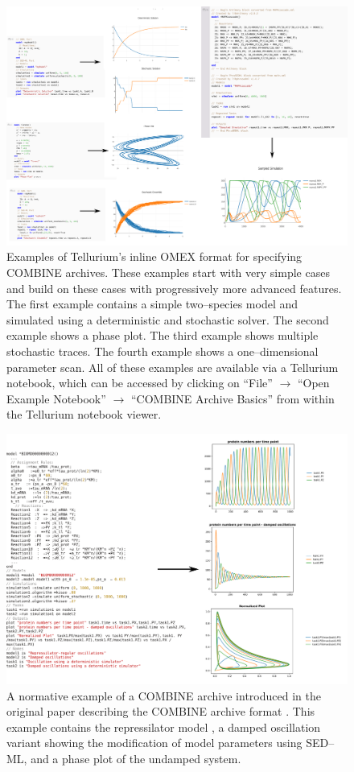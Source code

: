 \documentclass[10pt,letterpaper]{article}
\begin{document}
\begin{figure}
  \includegraphics[width=1.0\textwidth]{fig-inline-omex.pdf}
  \caption{Examples of Tellurium's inline OMEX format for specifying COMBINE archives. These examples start with very simple cases and build on these cases with progressively more advanced features. The first example contains a simple two--species model and simulated using a deterministic and stochastic solver. The second example shows a phase plot. The third example shows multiple stochastic traces. The fourth example shows a one--dimensional parameter scan. All of these examples are available via a Tellurium notebook, which can be accessed by clicking on ``File'' $\rightarrow$ ``Open Example Notebook'' $\rightarrow$ ``COMBINE Archive Basics'' from within the Tellurium notebook viewer. }
  \label{fig:inlineomex}
\end{figure}

\begin{figure}
  \includegraphics[width=\textwidth]{fig-bergmann2014.pdf}
  \caption{ A normative example of a COMBINE archive introduced  in the original paper describing the COMBINE archive format \cite{bergmann2014combine}. This example contains the repressilator model \cite{elowitz2000synthetic}, a damped oscillation variant showing the modification of model parameters using SED--ML, and a phase plot of the undamped system. }
  \label{fig:bergmann2014}
\end{figure}
\end{document}
